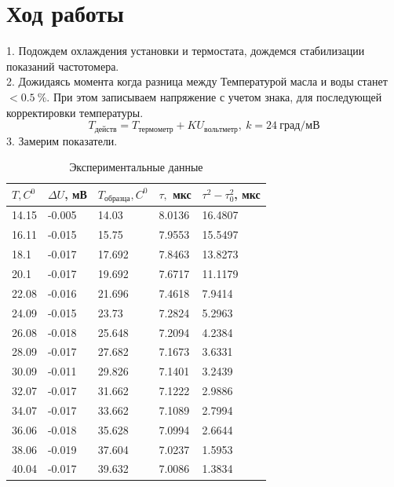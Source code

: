 \documentclass[a4paper, 12pt]{article}%
\begin{document}
	\section{Ход работы}
	1. Подождем охлаждения установки и термостата, дождемся стабилизации показаний частотомера.\\
	2. Дожидаясь момента когда разница между Температурой масла и воды станет $< 0.5 ~\%$. При этом записываем напряжение с учетом знака, для последующей корректировки температуры.\\
	\begin{equation*}
		T_{действ} = T_{термометр} + KU_{вольтметр},~ k= 24~град/мВ
	\end{equation*}
	3. Замерим показатели.\\
	\begin{table}[H]
		\centering
		\begin{tabular}{|l|l|l|l|l|}
			\hline
			$T, C^0$ & $\Delta U$, мВ & $T_{образца}, C^0$   & $\tau,$ мкс & $\tau^2 - \tau_0^2$, мкс \\ \hline
			14.15  & -0.005      & 14.03  & 8.0136     & 16.4807       \\ \hline
			16.11  & -0.015      & 15.75  & 7.9553     & 15.5497       \\ \hline
			18.1   & -0.017      & 17.692 & 7.8463     & 13.8273       \\ \hline
			20.1   & -0.017      & 19.692 & 7.6717     & 11.1179       \\ \hline
			22.08  & -0.016      & 21.696 & 7.4618     & 7.9414       \\ \hline
			24.09  & -0.015      & 23.73  & 7.2824     & 5.2963       \\ \hline
			26.08  & -0.018      & 25.648 & 7.2094     & 4.2384       \\ \hline
			28.09  & -0.017      & 27.682 & 7.1673     & 3.6331       \\ \hline
			30.09  & -0.011      & 29.826 & 7.1401     & 3.2439       \\ \hline
			32.07  & -0.017      & 31.662 & 7.1222     & 2.9886       \\ \hline
			34.07  & -0.017      & 33.662 & 7.1089     & 2.7994       \\ \hline
			36.06  & -0.018      & 35.628 & 7.0994     & 2.6644       \\ \hline
			38.06  & -0.019      & 37.604 & 7.0237     & 1.5953       \\ \hline
			40.04  & -0.017      & 39.632 & 7.0086     & 1.3834       \\ \hline
		\end{tabular}
		\caption{Экспериментальные данные}
	\end{table}
\end{document}
